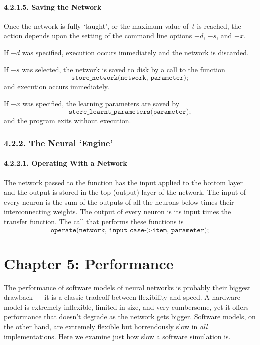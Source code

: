 \documentclass[12pt]{report}
\begin{document}
\subsubsection{4.2.1.5. Saving the Network}

Once the network is fully `taught', or the maximum value of~$t$ is
reached, the action depends upon the setting of the command line
options $-d$, $-s$, and $-x$.

If $-d$ was specified, execution occurs immediately and the network
is discarded.

If $-s$ was selected, the network is saved to disk by a call to the
function
$$
	\texttt{store\_network(network,\ parameter);}
$$
and execution occurs immediately.

If $-x$ was specified, the learning parameters are saved by
$$
	\texttt{store\_learnt\_parameters(parameter);}
$$
and the program exits without execution.

\subsection{4.2.2. The Neural `Engine'}

\subsubsection{4.2.2.1. Operating With a Network}

The network passed to the function has the input applied to the
bottom layer and the output is stored in the top (output) layer of
the network.
The input of every neuron is the sum of the outputs of all the
neurons below times their interconnecting weights.
The output of every neuron is its input times the transfer function.
The call that performs these functions is
$$
	\texttt{operate(network,\ input\_case->item,\ parameter);}
$$


\chapter{Chapter 5: Performance}

The performance of software models of neural networks is probably their biggest
drawback ---
it is a classic tradeoff between flexibility and speed.
A hardware model is extremely inflexible, limited in size, and very 
cumbersome, yet it
offers performance that doesn't degrade as the network gets bigger.
Software models, on the other hand, are extremely flexible but
horrendously slow in {\sl all} implementations.
Here we examine just how slow a software simulation is.
\end{document}
